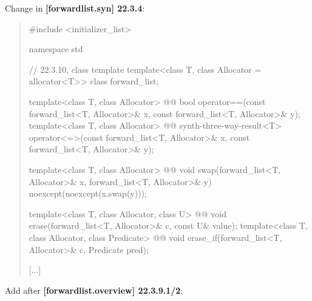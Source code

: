\documentclass{wg21}
\begin{document}
Change in \textbf{[forwardlist.syn] 22.3.4}:
\begin{quote}
\begin{codeblock}
#include <initializer_list>

namespace std {
  // 22.3.10, class template 
  template<class T, class Allocator = allocator<T>> class forward_list;

  template<class T, class Allocator>
    @@ bool operator==(const forward_list<T, Allocator>& x, const forward_list<T, Allocator>& y);
  template<class T, class Allocator>
    @@ synth-three-way-result<T> operator<=>(const forward_list<T, Allocator>& x, const forward_list<T, Allocator>& y);

  template<class T, class Allocator>
    @@ void swap(forward_list<T, Allocator>& x, forward_list<T, Allocator>& y)
      noexcept(noexcept(x.swap(y)));
      
  template<class T, class Allocator, class U>
    @@ void erase(forward_list<T, Allocator>& c, const U& value);
  template<class T, class Allocator, class Predicate>
    @@ void erase_if(forward_list<T, Allocator>& c, Predicate pred);    

  [...]
}
\end{codeblock}
\end{quote}

Add after \textbf{[forwardlist.overview] 22.3.9.1/2}:
\begin{quote}
\end{quote}
\end{document}
